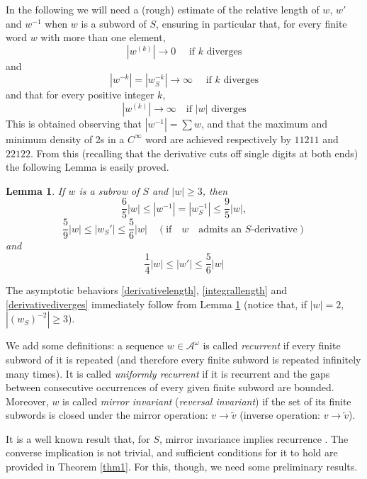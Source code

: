 \documentclass[10pt,a4paper]{article}
\newtheorem{lemma}{Lemma}
\begin{document}
 In the following we will need a (rough) estimate of the relative length of $w$, $w'$ and $w^{-1}$ when $w$ is a subword of $S$, ensuring in particular that, for every finite word $w$ with more than one element, 
\begin{equation}
|w^{(k)}|\rightarrow 0\quad \text{ if $k$ diverges}
\label{derivativelength}
\end{equation}
and
\begin{equation}
|w^{-k}|=|w_S^{-k}|\rightarrow \infty\quad \text{ if $k$ diverges}
\label{integrallength}
\end{equation}
and that for every positive integer $k$,
\begin{equation}
|w^{(k)}|\rightarrow \infty\quad \text{if $|w|$ diverges}
\label{derivativediverges}
\end{equation}
This is obtained observing that $|w^{-1}|=\sum w$, and that the maximum and minimum density of 2s in a $C^{\infty}$ word are achieved respectively by $11211$ and $22122$. From this (recalling that the derivative cuts off single digits at both ends) the following Lemma is easily proved. 
\begin{lemma}
If $w$ is a subrow of $S$ and $|w|\ge 3$, then $$\frac{6}{5}|w| \le |w^{-1}|=|w_S^{-1}|\le \frac{9}{5}|w|,$$ $$\frac{5}{9}|w| \le |w_S'|\le \frac{5}{6}|w|\quad(\text{if} \quad w \quad \text{admits}\,\, \text{an}\,\, S\text{-derivative})$$ and $$\frac{1}{4}|w|\le |w'|\le \frac{5}{6}|w|$$  
\label{lengthestimates}
\end{lemma}
 The asymptotic behaviors \eqref{derivativelength},  \eqref{integrallength} and \eqref{derivativediverges} immediately follow from Lemma \ref{lengthestimates} (notice that, if $|w|=2$, $|(w_S)^{-2}|\ge 3$). 

We add some definitions: a sequence $w\in \mathcal{A}^{\omega}$ is called \textit{recurrent} if every finite subword of it is repeated (and therefore every finite subword is repeated infinitely many times). It is called \textit{uniformly recurrent} if it is recurrent and the gaps between consecutive occurrences of every given finite subword are bounded. Moreover, $w$ is called \textit{mirror invariant} (\textit{reversal invariant}) if the set of its finite subwords is closed under the mirror operation: $v\rightarrow \widetilde{v}$ (inverse operation: $v\rightarrow \overleftarrow{v}$). 

It is a well known result that, for $S$, mirror invariance implies recurrence \cite{dekking1997long}. The converse implication is not trivial, and sufficient conditions for it to hold are provided in Theorem \ref{thm1}. For this, though, we need some preliminary results. 
\end{document}
